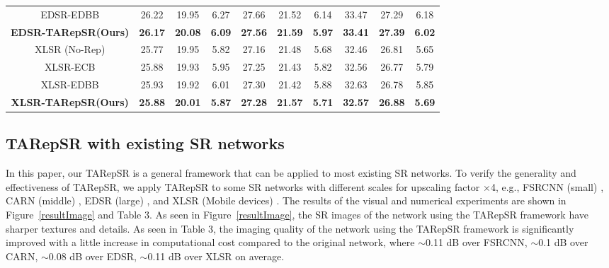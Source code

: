\documentclass[sn-mathphys]{sn-jnl}%
\theoremstyle{thmstyleone}%
\theoremstyle{thmstyletwo}%
\theoremstyle{thmstylethree}%
\begin{document}
\begin{table}[h!]
{\begin{tabular}{c|ccc|ccc|ccc}
EDSR-EDBB       & 26.22    & 19.95     & 6.27     & 27.66     & 21.52    & 6.14    &33.47 &27.29  &6.18                \\
\textbf{EDSR-TARepSR(Ours)} & \textbf{\textbf{26.17}} & \textbf{\textbf{20.08}} & \textbf{\textbf{6.09}} & \textbf{\textbf{27.56}} & \textbf{\textbf{21.59}} & \textbf{\textbf{5.97}}  &\textbf{\textbf{33.41}} &\textbf{\textbf{27.39}} &\textbf{\textbf{6.02}} \\
\hline
XLSR (No-Rep)       & 25.77     & 19.95      & 5.82        & 27.16         & 21.48                   & 5.68    &32.46 &26.81  &5.65                \\
XLSR-ECB          & 25.88      & 19.93      & 5.95     & 27.25       & 21.43    & 5.82  &32.56 &26.77 &5.79                  \\
XLSR-EDBB       & 25.93    & 19.92     & 6.01     & 27.30     & 21.42    & 5.88    &32.63 &26.78  &5.85                \\
\textbf{XLSR-TARepSR(Ours)} & \textbf{\textbf{25.88}} & \textbf{\textbf{20.01}} & \textbf{\textbf{5.87}} & \textbf{\textbf{27.28}} & \textbf{\textbf{21.57}} & \textbf{\textbf{5.71}}  &\textbf{\textbf{32.57}} &\textbf{\textbf{26.88}} &\textbf{\textbf{5.69}} \\
\hline
\end{tabular}
}
\end{table}

\subsection{TARepSR with existing SR networks}
In this paper, our TARepSR is a general framework that can be applied to most existing SR networks. To verify the generality and effectiveness of TARepSR, we apply TARepSR to some SR networks with different scales for upscaling factor $\times$4, e.g., FSRCNN (small) \cite{FSRCNN}, CARN (middle) \cite{CARN}, EDSR (large) \cite{EDSR}, and XLSR (Mobile devices) \cite{XLSR}. The results of the visual and numerical experiments are shown in Figure~\ref{resultImage} and Table 3. As seen in Figure~\ref{resultImage}, the SR images of the network using the TARepSR framework have sharper textures and details. As seen in Table 3, the imaging quality of the network using the TARepSR framework is significantly improved with a little increase in computational cost compared to the original network, where $\sim$0.11 dB over FSRCNN, $\sim$0.1 dB over CARN, $\sim$0.08 dB over EDSR, $\sim$0.11 dB over XLSR on average.
\end{document}
